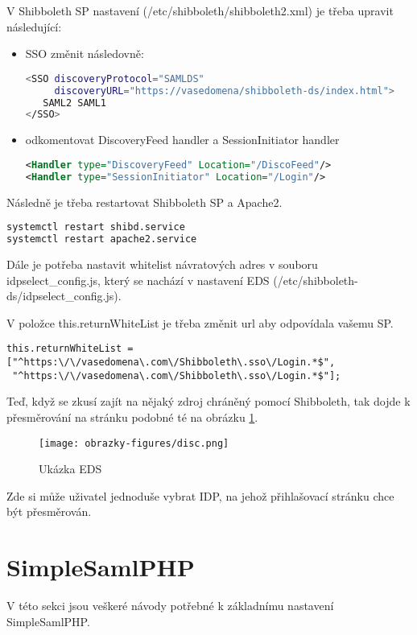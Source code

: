 V Shibboleth SP nastavení (/etc/shibboleth/shibboleth2.xml) je třeba upravit následující:\\
 \begin{itemize}
    \item
SSO změnit následovně:

\begin{lstlisting}[language=Bash]
<SSO discoveryProtocol="SAMLDS" 
     discoveryURL="https://vasedomena/shibboleth-ds/index.html">
   SAML2 SAML1
</SSO>
\end{lstlisting}
\item
odkomentovat DiscoveryFeed handler a SessionInitiator handler

\begin{lstlisting}[language=xml]
<Handler type="DiscoveryFeed" Location="/DiscoFeed"/>
<Handler type="SessionInitiator" Location="/Login"/>
\end{lstlisting}
\end{itemize}
Následně je třeba restartovat Shibboleth SP a Apache2.

\begin{lstlisting}[language=Bash]
systemctl restart shibd.service
systemctl restart apache2.service
\end{lstlisting}

Dále je potřeba nastavit whitelist návratových adres v souboru idpselect\_config.js, který se nachází v nastavení EDS (/etc/shibboleth-ds/idpselect\_config.js).

V položce this.returnWhiteList je třeba změnit url aby odpovídala vašemu SP. 

\begin{lstlisting}[]
this.returnWhiteList = 
["^https:\/\/vasedomena\.com\/Shibboleth\.sso\/Login.*$",
 "^https:\/\/vasedomena\.com\/Shibboleth\.sso\/Login.*$"];
\end{lstlisting}

Teď, když se zkusí zajít na nějaký zdroj chráněný pomocí Shibboleth, tak dojde k přesměrování na stránku podobné té na obrázku \ref{EDS}.

\begin{figure}[bp]
	\centering
    \texttt{[image: obrazky-figures/disc.png]}
	\caption{Ukázka EDS}
	\label{EDS}
\end{figure}

Zde si může uživatel jednoduše vybrat IDP, na jehož přihlašovací stránku chce být přesměrován.

\section{SimpleSamlPHP} %
V této sekci jsou veškeré návody potřebné k základnímu nastavení SimpleSamlPHP.
